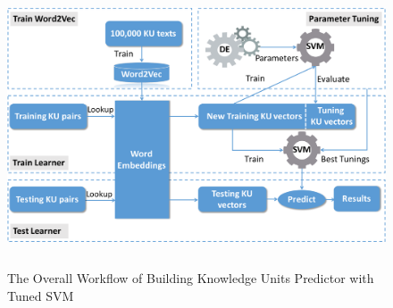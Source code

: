 \documentclass[sigconf,review, anonymous]{acmart}
\theoremstyle{break}
\begin{document}
 



 \begin{figure}
    \centering
     \includegraphics[width=\textwidth,height=3.3in]{pic/workflow.pdf} %
    \caption{The Overall Workflow of Building Knowledge Units Predictor with Tuned SVM}
    \label{fig:workflow}
\end{figure}
\end{document}
